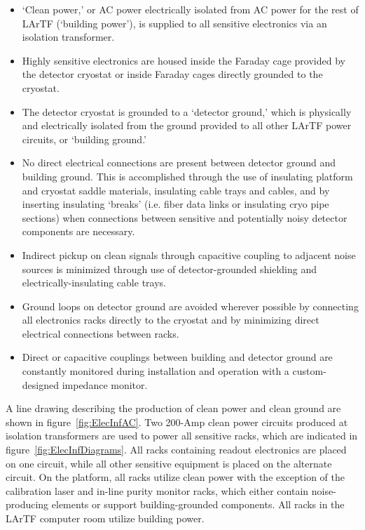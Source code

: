 \begin{itemize}
\item{`Clean power,' or AC power electrically isolated from AC power for the rest of LArTF (`building power'), is supplied to all sensitive electronics via an isolation transformer.}
\item{Highly sensitive electronics are housed inside the Faraday cage provided by the detector cryostat or inside Faraday cages directly grounded to the cryostat.}
\item{The detector cryostat is grounded to a `detector ground,' which is physically and electrically isolated from the ground provided to all other LArTF power circuits, or `building ground.'}
\item{No direct electrical connections are present between detector ground and building ground.  This is accomplished through the use of insulating platform and cryostat saddle materials, insulating cable trays and cables, and by inserting insulating `breaks' (i.e. fiber data links or insulating cryo pipe sections) when connections between sensitive and potentially noisy detector components are necessary.}
\item{Indirect pickup on clean signals through capacitive coupling to adjacent noise sources is minimized through use of detector-grounded shielding and electrically-insulating cable trays.}
\item{Ground loops on detector ground are avoided wherever possible by connecting all electronics racks directly to the cryostat and by minimizing direct electrical connections between racks.}
\item{Direct or capacitive couplings between building and detector ground are constantly monitored during installation and operation with a custom-designed impedance monitor.}
\end{itemize}

A line drawing describing the production of clean power and clean ground are shown in figure~\ref{fig:ElecInfAC}.  Two 200-Amp clean power circuits produced at isolation transformers are used to power all sensitive racks, which are indicated in figure~\ref{fig:ElecInfDiagrams}.  All racks containing \lartpc readout electronics are placed on one circuit, while all other sensitive equipment is placed on the alternate circuit.  On the platform, all racks utilize clean power with the exception of the calibration laser and in-line purity monitor racks, which either contain noise-producing elements or support building-grounded components.  All racks in the LArTF computer room utilize building power.

